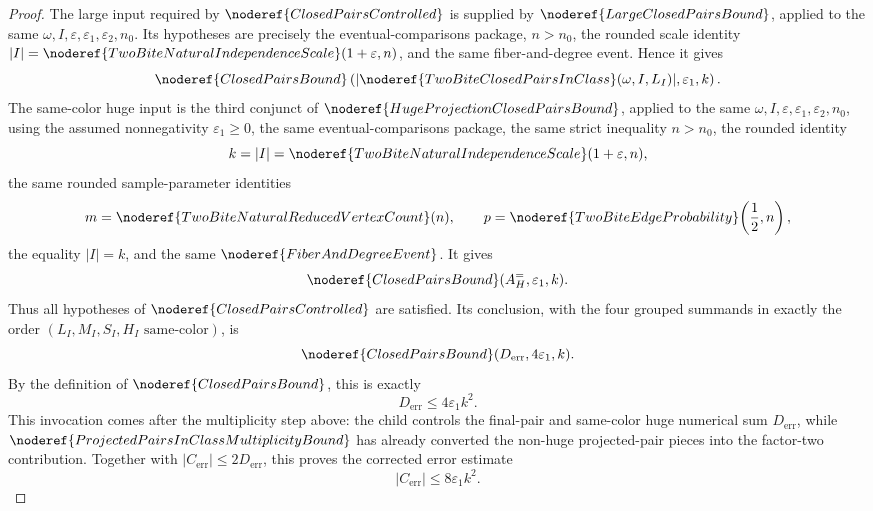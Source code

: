 \begin{proof}
The large input required by \(\noderef{ClosedPairsControlled}\) is supplied by
\(\noderef{LargeClosedPairsBound}\), applied to the same
\(\omega,I,\varepsilon,\varepsilon_1,\varepsilon_2,n_0\).  Its hypotheses are
precisely the eventual-comparisons package, \(n>n_0\), the rounded scale
identity \(|I|=\noderef{TwoBiteNaturalIndependenceScale}(1+\varepsilon,n)\),
and the same fiber-and-degree event.  Hence it gives
\[
\noderef{ClosedPairsBound}
\left(|\noderef{TwoBiteClosedPairsInClass}(\omega,I,L_I)|,\varepsilon_1,k\right).
\]
The same-color huge input is the third conjunct of
\(\noderef{HugeProjectionClosedPairsBound}\), applied to the same
\(\omega,I,\varepsilon,\varepsilon_1,\varepsilon_2,n_0\), using the assumed
nonnegativity \(\varepsilon_1\ge0\), the same eventual-comparisons package,
the same strict inequality \(n>n_0\), the rounded identity
\[
k=|I|=\noderef{TwoBiteNaturalIndependenceScale}(1+\varepsilon,n),
\]
the same rounded sample-parameter identities
\[
m=\noderef{TwoBiteNaturalReducedVertexCount}(n),\qquad
p=\noderef{TwoBiteEdgeProbability}\!\left(\frac12,n\right),
\]
the equality \(|I|=k\), and the same \(\noderef{FiberAndDegreeEvent}\).  It
gives
\[
\noderef{ClosedPairsBound}(A_H^{=},\varepsilon_1,k).
\]
Thus all hypotheses of \(\noderef{ClosedPairsControlled}\) are satisfied.
Its conclusion, with the four grouped summands in exactly the order
\((L_I,M_I,S_I,H_I\text{ same-color})\), is
\[
\noderef{ClosedPairsBound}(D_{\mathrm{err}},4\varepsilon_1,k).
\]
By the definition of \(\noderef{ClosedPairsBound}\), this is exactly
\[
D_{\mathrm{err}}\le 4\varepsilon_1k^2.
\]
This invocation comes after the multiplicity step above: the child controls
the final-pair and same-color huge numerical sum \(D_{\mathrm{err}}\), while
\(\noderef{ProjectedPairsInClassMultiplicityBound}\) has already converted
the non-huge projected-pair pieces into the factor-two contribution.  Together
with \(|C_{\mathrm{err}}|\le 2D_{\mathrm{err}}\), this proves the
corrected error estimate
\[
|C_{\mathrm{err}}|\le 8\varepsilon_1k^2.
\]


\end{proof}
